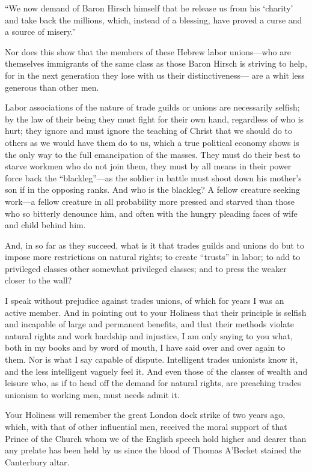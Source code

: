 \documentclass{book}
\begin{document}
“We now demand of Baron Hirsch himself that he release us from his ‘charity’ and take back the millions, which, instead of a blessing, have proved a curse and a source of misery.”

Nor does this show that the members of these Hebrew labor unions—who are themselves immigrants of the same class as those Baron Hirsch is striving to help, for in the next generation they lose with us their distinctiveness— are a whit less generous than other men.

Labor associations of the nature of trade guilds or unions are necessarily selfish; by the law of their being they must fight for their own hand, regardless of who is hurt; they ignore and must ignore the teaching of Christ that we should do to others as we would have them do to us, which a true political economy shows is the only way to the full emancipation of the masses. They must do their best to starve workmen who do not join them, they must by all means in their power force back the “blackleg”—as the soldier in battle must shoot down his mother’s son if in the opposing ranks. And who is the blackleg? A fellow creature seeking work—a fellow creature in all probability more pressed and starved than those who so bitterly denounce him, and often with the hungry pleading faces of wife and child behind him.

And, in so far as they succeed, what is it that trades guilds and unions do but to impose more restrictions on natural rights; to create “trusts” in labor; to add to privileged classes other somewhat privileged classes; and to press the weaker closer to the wall?

I speak without prejudice against trades unions, of which for years I was an active member. And in pointing out to your Holiness that their principle is selfish and incapable of large and permanent benefits, and that their methods violate natural rights and work hardship and injustice, I am only saying to you what, both in my books and by word of mouth, I have said over and over again to them. Nor is what I say capable of dispute. Intelligent trades unionists know it, and the less intelligent vaguely feel it. And even those of the classes of wealth and leisure who, as if to head off the demand for natural rights, are preaching trades unionism to working men, must needs admit it.

Your Holiness will remember the great London dock strike of two years ago, which, with that of other influential men, received the moral support of that Prince of the Church whom we of the English speech hold higher and dearer than any prelate has been held by us since the blood of Thomas A’Becket stained the Canterbury altar.
\end{document}
